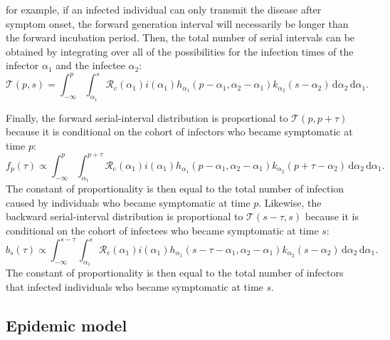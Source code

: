\documentclass[12pt]{article}
\newcommand{\Rx}[1]{\ensuremath{{\mathcal R}_{#1}}\xspace}
\newcommand{\Rc}{\Rx{\mathrm{c}}}
\newcommand{\pt}{p} %
\newcommand{\st}{s} %
\newcommand{\total}{{\mathcal T}} %
\begin{document}
for example, if an infected individual can only transmit the disease after symptom onset, the forward generation interval will necessarily be longer than the forward incubation period.
Then, the total number of serial intervals can be obtained by integrating over all of the possibilities for the infection times of the infector $\alpha_1$ and the infectee $\alpha_2$:
\begin{equation}
\total (\pt,\st) = \int_{-\infty}^{\pt} \int_{\alpha_1}^{\st} \Rc (\alpha_1) i(\alpha_1) h_{\alpha_1}(\pt-\alpha_1, \alpha_2 - \alpha_1) k_{\alpha_2}(\st - \alpha_2) \, \mathrm{d}\alpha_2\,\mathrm{d}\alpha_1.
\end{equation}

Finally, the forward serial-interval distribution is proportional to $\total (\pt, \pt+\tau)$ because it is conditional on the cohort of infectors who became symptomatic at time $\pt$:
\begin{equation}
f_\pt(\tau) \propto \int_{-\infty}^{\pt} \int_{\alpha_1}^{\pt+\tau} \Rc (\alpha_1) i(\alpha_1) h_{\alpha_1}(\pt-\alpha_1, \alpha_2 - \alpha_1) k_{\alpha_2}(\pt+\tau - \alpha_2) \, \mathrm{d}\alpha_2\,\mathrm{d}\alpha_1.
\end{equation}
The constant of proportionality is then equal to the total number of infection caused by individuals who became symptomatic at time $\pt$.
Likewise, the backward serial-interval distribution is proportional to $\total (\st-\tau, \st)$ because it is conditional on the cohort of infectees who became symptomatic at time $\st$:
\begin{equation}
b_\st(\tau) \propto \int_{-\infty}^{\st-\tau} \int_{\alpha_1}^{\st} \Rc (\alpha_1) i(\alpha_1) h_{\alpha_1}(\st-\tau-\alpha_1, \alpha_2 - \alpha_1) k_{\alpha_2}(\st - \alpha_2) \, \mathrm{d}\alpha_2\,\mathrm{d}\alpha_1.
\end{equation}
The constant of proportionality is then equal to the total number of infectors that infected individuals who became symptomatic at time $\st$.

\subsection{Epidemic model}
\end{document}
